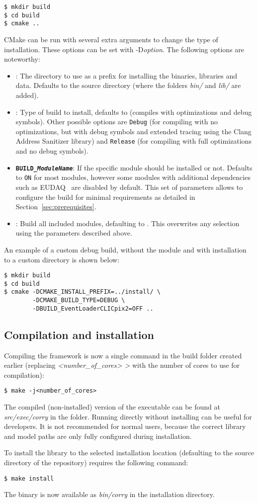 \begin{verbatim}
$ mkdir build
$ cd build
$ cmake ..
\end{verbatim}

CMake can be run with several extra arguments to change the type of installation.
These options can be set with -D\textit{option}.
The following options are noteworthy:
\begin{itemize}
\item {}: The directory to use as a prefix for installing the binaries, libraries and data.
Defaults to the source directory (where the folders \textit{bin/} and \textit{lib/} are added).
\item {}: Type of build to install, defaults to  (compiles with optimizations and debug symbols).
Other possible options are \texttt{Debug} (for compiling with no optimizations, but with debug symbols and extended tracing using the Clang Address Sanitizer library) and \texttt{Release} (for compiling with full optimizations and no debug symbols).
\item \textbf{\texttt{BUILD\_\textit{ModuleName}}}: If the specific module  should be installed or not.
Defaults to \texttt{ON} for most modules, however some modules with additional dependencies such as EUDAQ~\cite{eudaq} are disabled by default.
This set of parameters allows to configure the build for minimal requirements as detailed in Section~\ref{sec:prerequisites}.
\item {}: Build all included modules, defaulting to .
This overwrites any selection using the parameters described above.
\end{itemize}

An example of a custom debug build, without the  module and with installation to a custom directory is shown below:
\begin{verbatim}
$ mkdir build
$ cd build
$ cmake -DCMAKE_INSTALL_PREFIX=../install/ \
        -DCMAKE_BUILD_TYPE=DEBUG \
        -DBUILD_EventLoaderCLICpix2=OFF ..
\end{verbatim}

\subsection{Compilation and installation}
Compiling the framework is now a single command in the build folder created earlier (replacing \textit{\textless number\_of\_cores> \textgreater} with the number of cores to use for compilation):
\begin{verbatim}
$ make -j<number_of_cores>
\end{verbatim}
The compiled (non-installed) version of the executable can be found at \textit{src/exec/corry} in the  folder.
Running \corry directly without installing can be useful for developers.
It is not recommended for normal users, because the correct library and model paths are only fully configured during installation.

To install the library to the selected installation location (defaulting to the source directory of the repository) requires the following command:
\begin{verbatim}
$ make install
\end{verbatim}

The binary is now available as \textit{bin/corry} in the installation directory.
